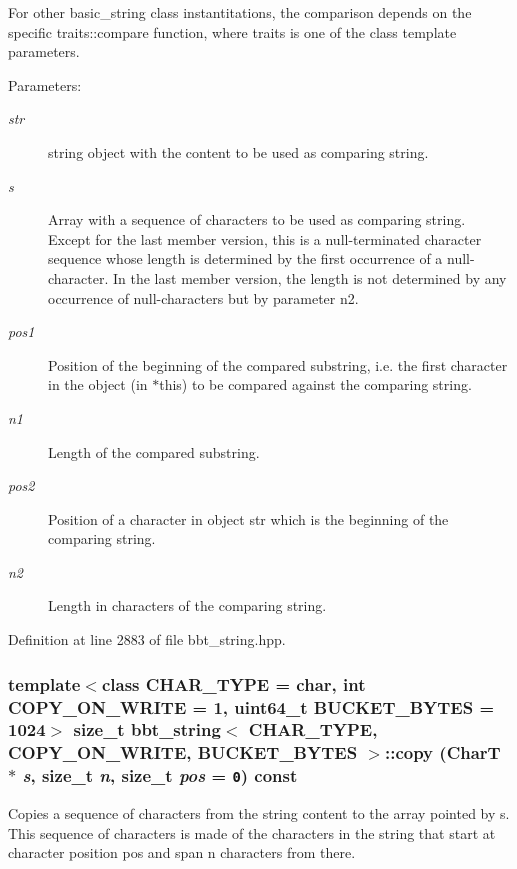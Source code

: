 For other basic\_\-string class instantitations, the comparison depends on the specific traits::compare function, where traits is one of the class template parameters.

\begin{Desc}
\item[Parameters:]
\begin{description}
\item[{\em str}]string object with the content to be used as comparing string. \item[{\em s}]Array with a sequence of characters to be used as comparing string. Except for the last member version, this is a null-terminated character sequence whose length is determined by the first occurrence of a null-character. In the last member version, the length is not determined by any occurrence of null-characters but by parameter n2. \item[{\em pos1}]Position of the beginning of the compared substring, i.e. the first character in the object (in $\ast$this) to be compared against the comparing string. \item[{\em n1}]Length of the compared substring. \item[{\em pos2}]Position of a character in object str which is the beginning of the comparing string. \item[{\em n2}]Length in characters of the comparing string. \end{description}
\end{Desc}


Definition at line 2883 of file bbt\_\-string.hpp.\hypertarget{classbbt__string_0873ce9d57fa0817c63678cf42bb6ff6}{
\subsubsection[{copy}]{\setlength{\rightskip}{0pt plus 5cm}template$<$class CHAR\_\-TYPE  = char, int COPY\_\-ON\_\-WRITE = 1, uint64\_\-t BUCKET\_\-BYTES = 1024$>$ size\_\-t {\bf bbt\_\-string}$<$ CHAR\_\-TYPE, COPY\_\-ON\_\-WRITE, BUCKET\_\-BYTES $>$::copy (CharT $\ast$ {\em s}, \/  size\_\-t {\em n}, \/  size\_\-t {\em pos} = {\tt 0}) const}}
\label{classbbt__string_0873ce9d57fa0817c63678cf42bb6ff6}


Copies a sequence of characters from the string content to the array pointed by s. This sequence of characters is made of the characters in the string that start at character position pos and span n characters from there.

